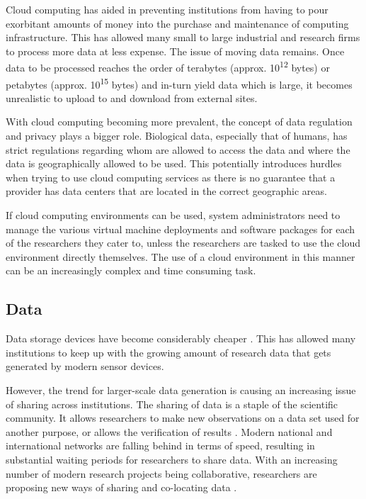 Cloud computing has aided in preventing institutions from having to pour exorbitant amounts of money into the purchase and maintenance of computing infrastructure. This has allowed many small to large industrial and research firms to process more data at less expense. The issue of moving data remains. Once data to be processed reaches the order of terabytes (approx. 10\textsuperscript{12} bytes) or petabytes (approx. 10\textsuperscript{15} bytes) and in-turn yield data which is large, it becomes unrealistic to upload to and download from external sites.

With cloud computing becoming more prevalent, the concept of data regulation and privacy plays a bigger role. Biological data, especially that of humans, has strict regulations regarding whom are allowed to access the data and where the data is geographically allowed to be used. This potentially introduces hurdles when trying to use cloud computing services as there is no guarantee that a provider has data centers that are located in the correct geographic areas.

If cloud computing environments can be used, system administrators need to manage the various virtual machine deployments and software packages for each of the researchers they cater to, unless the researchers are tasked to use the cloud environment directly themselves. The use of a cloud environment in this manner can be an increasingly complex and time consuming task.


\subsection{Data}

Data storage devices have become considerably cheaper \parencite{backblaze}. This has allowed many institutions to keep up with the growing amount of research data that gets generated by modern sensor devices.

However, the trend for larger-scale data generation is causing an increasing issue of sharing across institutions. The sharing of data is a staple of the scientific community. It allows researchers to make new observations on a data set used for another purpose, or allows the verification of results \parencite{birnholtz2003data}. Modern national and international networks are falling behind in terms of speed, resulting in substantial waiting periods for researchers to share data. With an increasing number of modern research projects being collaborative, researchers are proposing new ways of sharing and co-locating data \citep{foster2003virtual,zhao2006virtual,pavlo2009comparison,winter2007electronic}.


